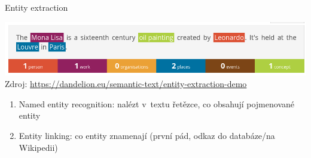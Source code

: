 \documentclass[handout,aspectratio=169,dvipsnames]{beamer}
\begin{document}
\begin{frame}{Entity extraction}

    \includegraphics[scale=.4]{./img/mona_lisa.png} \\
    {\tiny Zdroj: \url{https://dandelion.eu/semantic-text/entity-extraction-demo}}

    \vspace{10pt}

    \begin{enumerate}

        \item<3-> Named entity recognition: nalézt v~textu řetězce, co obsahují
            pojmenované entity

        \item<4-> Entity linking: co entity znamenají (první pád, odkaz do
            databáze/na Wikipedii)

    \end{enumerate}

\end{frame}

\end{document}

